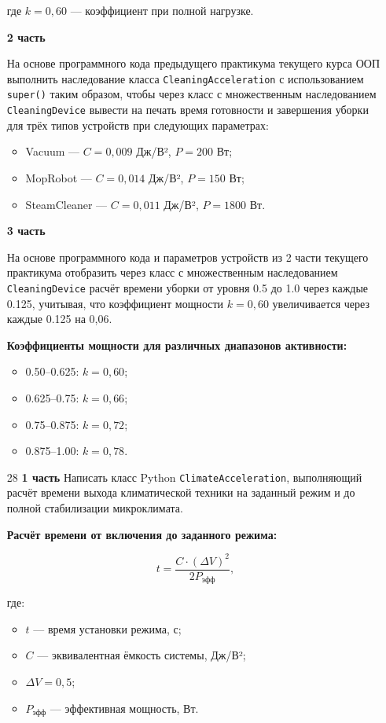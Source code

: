 \begin{enumerate}
где $k = 0{,}60$ — коэффициент при полной нагрузке.

\textbf{2 часть}

На основе программного кода предыдущего практикума текущего курса ООП выполнить наследование класса \texttt{CleaningAcceleration} с использованием \texttt{super()} таким образом, чтобы через класс с множественным наследованием \texttt{CleaningDevice} вывести на печать время готовности и завершения уборки для трёх типов устройств при следующих параметрах:

\begin{itemize}
    \item Vacuum — $C = 0{,}009$ Дж/В², $P = 200$ Вт;  
    \item MopRobot — $C = 0{,}014$ Дж/В², $P = 150$ Вт;  
    \item SteamCleaner — $C = 0{,}011$ Дж/В², $P = 1800$ Вт.  
\end{itemize}

\textbf{3 часть}

На основе программного кода и параметров устройств из 2 части текущего практикума отобразить через класс с множественным наследованием \texttt{CleaningDevice} расчёт времени уборки от уровня 0.5 до 1.0 через каждые 0.125, учитывая, что коэффициент мощности $k = 0{,}60$ увеличивается через каждые 0.125 на 0{,}06.

\textbf{Коэффициенты мощности для различных диапазонов активности:}
\begin{itemize}
    \item 0.50–0.625: $k = 0{,}60$;  
    \item 0.625–0.75: $k = 0{,}66$;  
    \item 0.75–0.875: $k = 0{,}72$;  
    \item 0.875–1.00: $k = 0{,}78$.  
\end{itemize}


\item[28] \textbf{1 часть}  
Написать класс Python \texttt{ClimateAcceleration}, выполняющий расчёт времени выхода климатической техники на заданный режим и до полной стабилизации микроклимата.

\textbf{Расчёт времени от включения до заданного режима:}

\begin{equation}
t = \frac{C \cdot (\Delta V)^2}{2P_{\text{эфф}}},
\end{equation}

где:  
\begin{itemize}
    \item $t$ — время установки режима, с;  
    \item $C$ — эквивалентная ёмкость системы, Дж/В²;  
    \item $\Delta V = 0{,}5$;  
    \item $P_{\text{эфф}}$ — эффективная мощность, Вт.  
\end{itemize}


\end{enumerate}
